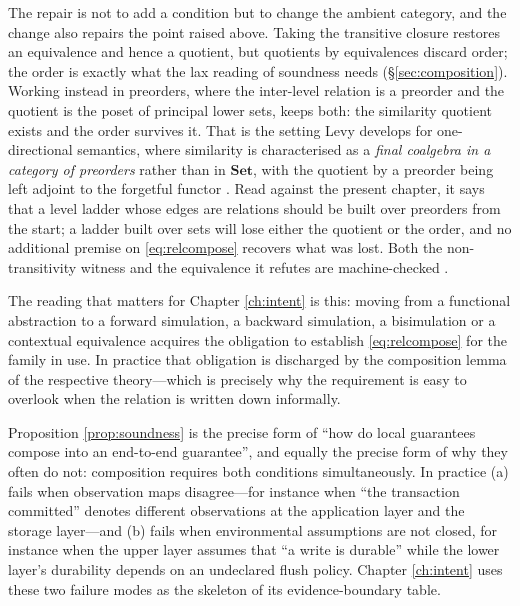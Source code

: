 \begin{remark}
The repair is not to add a condition but to change the ambient category, and the change also repairs
the point raised above. Taking the transitive closure restores an equivalence and hence a quotient,
but quotients by equivalences discard order; the order is exactly what the lax reading of soundness
needs (\S\ref{sec:composition}). Working instead in preorders, where the inter-level relation is a
preorder and the quotient is the poset of principal lower sets, keeps both: the similarity quotient
exists and the order survives it. That is the setting Levy develops for one-directional semantics,
where similarity is characterised as a \emph{final coalgebra in a category of preorders} rather than
in $\mathbf{Set}$, with the quotient by a preorder being left adjoint to the forgetful functor
\cite{levy2011}. Read against the present chapter, it says that a level ladder whose edges are
relations should be built over preorders from the start; a ladder built over sets will lose either
the quotient or the order, and no additional premise on \eqref{eq:relcompose} recovers what was lost.
Both the non-transitivity witness and the equivalence it refutes are machine-checked
\cite{assaylean}.

The reading that matters for Chapter \ref{ch:intent} is this: moving from a functional abstraction
to a forward simulation, a backward simulation, a bisimulation or a contextual equivalence acquires
the obligation to establish \eqref{eq:relcompose} for the family in use. In practice that obligation
is discharged by the composition lemma of the respective theory---which is precisely why the
requirement is easy to overlook when the relation is written down informally.
\end{remark}

\begin{remark}\label{rmk:why-compose-fails}
Proposition \ref{prop:soundness} is the precise form of ``how do local guarantees compose
into an end-to-end guarantee'', and equally the precise form of why they often do not:
composition requires both conditions simultaneously. In practice (a) fails when observation
maps disagree---for instance when ``the transaction committed'' denotes different
observations at the application layer and the storage layer---and (b) fails when
environmental assumptions are not closed, for instance when the upper layer assumes that
``a write is durable'' while the lower layer's durability depends on an undeclared flush
policy. Chapter \ref{ch:intent} uses these two failure modes as the skeleton of its
evidence-boundary table.
\end{remark}

